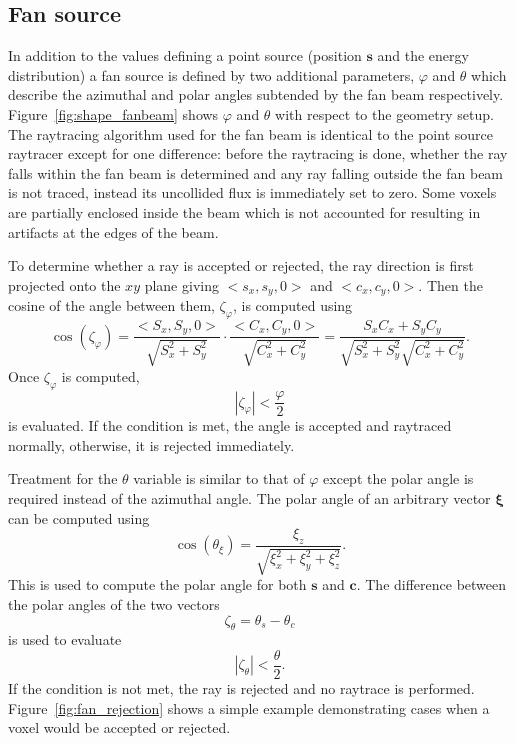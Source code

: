 \subsection{Fan source}
In addition to the values defining a point source (position $\boldsymbol{s}$ and the energy distribution) a fan source is defined by two additional parameters, $\varphi$ and $\theta$ which describe the azimuthal and polar angles subtended by the fan beam respectively. Figure~\ref{fig:shape_fanbeam} shows $\varphi$ and $\theta$ with respect to the geometry setup. The raytracing algorithm used for the fan beam is identical to the point source raytracer except for one difference: before the raytracing is done, whether the ray falls within the fan beam is determined and any ray falling outside the fan beam is not traced, instead its uncollided flux is immediately set to zero. Some voxels are partially enclosed inside the beam which is not accounted for resulting in artifacts at the edges of the beam.

To determine whether a ray is accepted or rejected, the ray direction is first projected onto the $xy$ plane giving $<s_x, s_y, 0>$ and $<c_x, c_y, 0>$. Then the cosine of the angle between them, $\zeta_\varphi$, is computed using 
\begin{equation}\label{eq:phicos}
\cos(\zeta_\varphi) = \frac{<S_x, S_y, 0>}{\sqrt{S_x^2 + S_y^2}} \cdot \frac{<C_x, C_y, 0>}{\sqrt{C_x^2 + C_y^2}} = \frac{S_x C_x + S_y C_y}{\sqrt{S_x^2 + S_y^2} \sqrt{C_x^2 + C_y^2}}.
\end{equation}
Once $\zeta_\varphi$ is computed,
\begin{equation}\label{eq:phicoscon}
|\zeta_\varphi| < \frac{\varphi}{2}
\end{equation}
is evaluated. If the condition is met, the angle is accepted and raytraced normally, otherwise, it is rejected immediately.

Treatment for the $\theta$ variable is similar to that of $\varphi$ except the polar angle is required instead of the azimuthal angle. The polar angle of an arbitrary vector $\boldsymbol{\xi}$ can be computed using \begin{equation}\label{eq:thetacos}
\cos(\theta_\xi) = \frac{\xi_z}{\sqrt{\xi_x^2 + \xi_y^2 + \xi_z^2}}.
\end{equation}
This is used to compute the polar angle for both $\boldsymbol{s}$ and $\boldsymbol{c}$. The difference between the polar angles of the two vectors 
\begin{equation}\label{eq:thetacos2}
\zeta_\theta = \theta_s - \theta_c
\end{equation}
is used to evaluate
\begin{equation}\label{eq:thetacoscon}
|\zeta_\theta| < \frac{\theta}{2}.
\end{equation}
If the condition is not met, the ray is rejected and no raytrace is performed. Figure~\ref{fig:fan_rejection} shows a simple example demonstrating cases when a voxel would be accepted or rejected.

